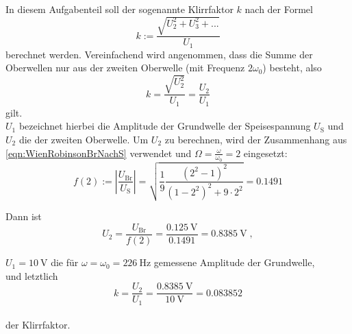 In diesem Aufgabenteil soll der sogenannte Klirrfaktor $k$ nach der Formel
\begin{equation}
     k := \frac{\sqrt{U_2^2 + U_3^2 + ...}}{U_1}
\end{equation}
berechnet werden.
Vereinfachend wird angenommen, dass die Summe der Oberwellen nur aus der zweiten Oberwelle (mit Frequenz $2\omega_0$) besteht, also
\begin{equation}
     k = \frac{\sqrt{U_2^2}}{U_1} = \frac{U_2}{U_1}
\end{equation}
gilt.
\ \\
$U_1$ bezeichnet hierbei die Amplitude der Grundwelle der Speisespannung $U_\text{S}$ und $U_2$ die der zweiten Oberwelle.
Um $U_2$ zu berechnen, wird der Zusammenhang aus \eqref{eqn:WienRobinsonBrNachS} verwendet
und $\Omega = \frac{\omega}{\omega_0} = 2$ eingesetzt:
\begin{equation}
  f(2)
  := \left\lvert \frac{U_\text{Br}}{U_\text{S}} \right\rvert
  =  \sqrt{ \frac{1}{9} \frac{(2^2 - 1)^2}{(1 - 2^2)^2 + 9 \cdot 2^2} }
  =  0.1491
\end{equation}

Dann ist
\begin{equation*}
  U_2
  = \frac{U_\text{Br}}{f(2)}
  = \frac{\SI{0.125}{\volt}}{\num{0.1491}}
  = \SI{0.8385}{\volt}
  \; ,
\end{equation*}

$U_1 = \SI{10}{\volt}$ die für $\omega=\omega_0=\SI{226}{\hertz}$ gemessene Amplitude der Grundwelle,
\ \\
und letztlich
\begin{equation*}
  k
  = \frac{U_2}{U_1}
  = \frac{\SI{0.8385}{\volt}}{\SI{10}{\volt}}
  = \num{0.083852}
\end{equation*}
\ \\
der Klirrfaktor.
